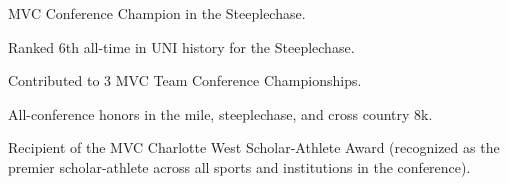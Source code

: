\item MVC Conference Champion in the Steeplechase.
\item Ranked 6th all-time in UNI history for the Steeplechase.
\item Contributed to 3 MVC Team Conference Championships.
\item All-conference honors in the mile, steeplechase, and cross country 8k.
\item Recipient of the MVC Charlotte West Scholar-Athlete Award (recognized as the premier scholar-athlete across all sports and institutions in the conference).
